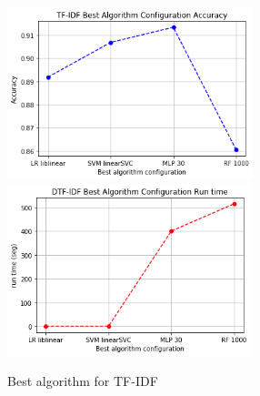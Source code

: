 \documentclass[oneside,onecolumn]{article}
\begin{document}
\begin{figure}[H]
	\centering
	
	\includegraphics[height=5cm]{report_plot/plot_tfidf/best_accuracy.png}
	\includegraphics[height=5cm]{report_plot/plot_tfidf/best_alg_runtime.png}
	
	\caption{Best algorithm for TF-IDF} 
	\label{fig:lowmutation}
\end{figure}
\end{document}
